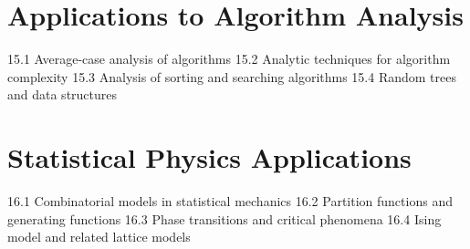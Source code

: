 \section{Applications to Algorithm Analysis}
15.1 Average-case analysis of algorithms
15.2 Analytic techniques for algorithm complexity
15.3 Analysis of sorting and searching algorithms
15.4 Random trees and data structures
\section{Statistical Physics Applications}
16.1 Combinatorial models in statistical mechanics
16.2 Partition functions and generating functions
16.3 Phase transitions and critical phenomena
16.4 Ising model and related lattice models
